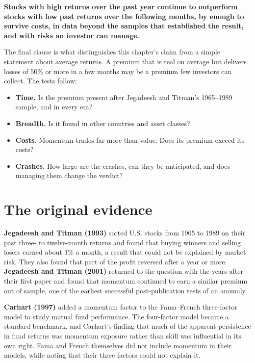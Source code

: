 \begin{callout}
\textbf{Stocks with high returns over the past year continue to outperform stocks with low past returns over the following months, by enough to survive costs, in data beyond the samples that established the result, and with risks an investor can manage.}
\end{callout}

The final clause is what distinguishes this chapter's claim from a simple statement about average returns. A premium that is real on average but delivers losses of 50\% or more in a few months may be a premium few investors can collect. The tests follow:

\begin{itemize}
  \item \textbf{Time.} Is the premium present after Jegadeesh and Titman's 1965--1989 sample, and in every era?
  \item \textbf{Breadth.} Is it found in other countries and asset classes?
  \item \textbf{Costs.} Momentum trades far more than value. Does its premium exceed its costs?
  \item \textbf{Crashes.} How large are the crashes, can they be anticipated, and does managing them change the verdict?
\end{itemize}

\section{The original evidence}
\label{sec:06-evidence}

\textbf{Jegadeesh and Titman (1993)} sorted U.S. stocks from 1965 to 1989 on their past three- to twelve-month returns and found that buying winners and selling losers earned about 1\% a month, a result that could not be explained by market risk. They also found that part of the profit reversed after a year or more. \textbf{Jegadeesh and Titman (2001)} returned to the question with the years after their first paper and found that momentum continued to earn a similar premium out of sample, one of the earliest successful post-publication tests of an anomaly.

\textbf{Carhart (1997)} added a momentum factor to the Fama--French three-factor model to study mutual fund performance. The four-factor model became a standard benchmark, and Carhart's finding that much of the apparent persistence in fund returns was momentum exposure rather than skill was influential in its own right. Fama and French themselves did not include momentum in their models, while noting that their three factors could not explain it.

